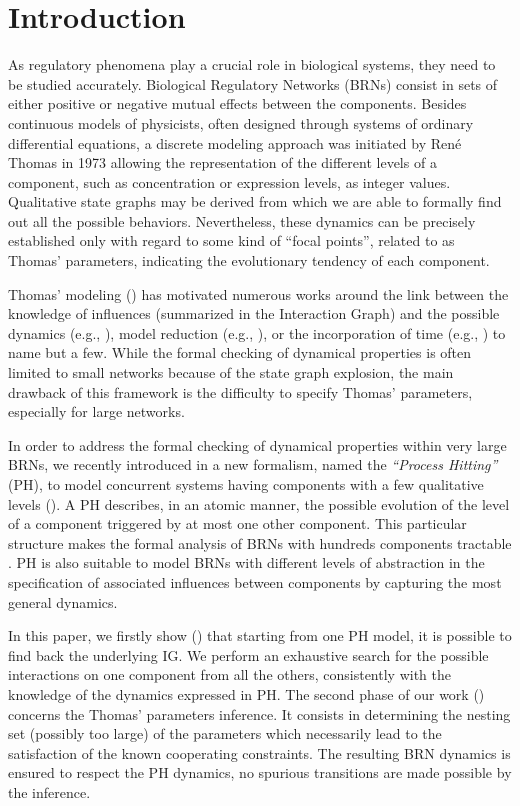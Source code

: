 \section{Introduction}
As regulatory phenomena play a crucial role in biological systems, they need to be studied accurately.
Biological Regulatory Networks (BRNs) consist in sets of either positive or negative mutual effects between the components.
Besides continuous models of physicists, often designed through systems of ordinary
differential equations, a discrete modeling approach was initiated by René Thomas in 1973
\cite{Thomas73} allowing the representation of the different levels of a component, such as concentration or expression levels, as integer values.
Qualitative state graphs may be derived from which we are able to formally find out all the possible behaviors.
Nevertheless, these dynamics can be precisely established only with regard to some kind of ``focal points'', related to as Thomas' parameters, indicating the evolutionary tendency of each component.

Thomas' modeling () has motivated numerous works around the link between the knowledge of influences
(summarized in the Interaction Graph) and the possible dynamics (e.g., \cite{RiCo07}), %
model reduction (e.g., \cite{Naldi09}), %
or the incorporation of time (e.g., \cite{Siebert06}) %
to name but a few.
While the formal checking of dynamical properties is often limited to small networks because of the
state graph explosion, the main drawback of this framework is the difficulty to specify Thomas'
parameters, especially for large networks.

In order to address the formal checking of dynamical properties within very large BRNs, we recently
introduced in \cite{PMR10-TCSB} a new formalism, named the \emph{``Process Hitting''} (PH), to model
concurrent systems having components with a few qualitative levels ().
A PH describes, in an atomic manner, the possible evolution of the level of a component
triggered by at most one other component.
This particular structure makes the formal analysis of BRNs with hundreds components tractable \cite{PMR12-MSCS}.
PH is also suitable to model BRNs with different levels of abstraction in the specification of
associated influences between components by capturing the most general dynamics.

In this paper, we firstly show () that starting from one PH model, it is possible to find back the underlying IG.
We perform an exhaustive search for the possible interactions on one component from all the
others, consistently with the knowledge of the dynamics expressed in PH.
The second phase of our work () concerns the Thomas' parameters inference.
It consists in determining the nesting set (possibly too large) of the parameters which necessarily
lead to the satisfaction of the known cooperating constraints.
The resulting BRN dynamics is ensured to respect the PH dynamics, \ie no spurious transitions are
made possible by the inference.

